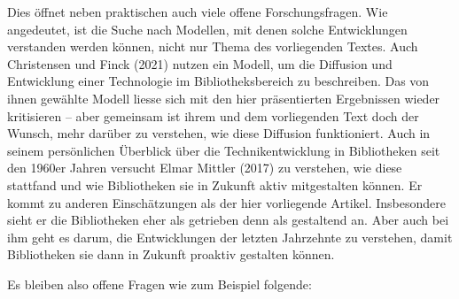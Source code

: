\documentclass[a4paper,
fontsize=11pt,
oneside,
numbers=noperiodatend,
parskip=half-,
bibliography=totoc,
final
]{scrartcl}
\begin{document}
Dies öffnet neben praktischen auch viele offene Forschungsfragen. Wie
angedeutet, ist die Suche nach Modellen, mit denen solche Entwicklungen
verstanden werden können, nicht nur Thema des vorliegenden Textes. Auch
Christensen und Finck (2021) nutzen ein Modell, um die Diffusion und
Entwicklung einer Technologie im Bibliotheksbereich zu beschreiben. Das
von ihnen gewählte Modell liesse sich mit den hier präsentierten
Ergebnissen wieder kritisieren -- aber gemeinsam ist ihrem und dem
vorliegenden Text doch der Wunsch, mehr darüber zu verstehen, wie diese
Diffusion funktioniert. Auch in seinem persönlichen Überblick über die
Technikentwicklung in Bibliotheken seit den 1960er Jahren versucht Elmar
Mittler (2017) zu verstehen, wie diese stattfand und wie Bibliotheken
sie in Zukunft aktiv mitgestalten können. Er kommt zu anderen
Einschätzungen als der hier vorliegende Artikel. Insbesondere sieht er
die Bibliotheken eher als getrieben denn als gestaltend an. Aber auch
bei ihm geht es darum, die Entwicklungen der letzten Jahrzehnte zu
verstehen, damit Bibliotheken sie dann in Zukunft proaktiv gestalten
können.

Es bleiben also offene Fragen wie zum Beispiel folgende:
\end{document}
